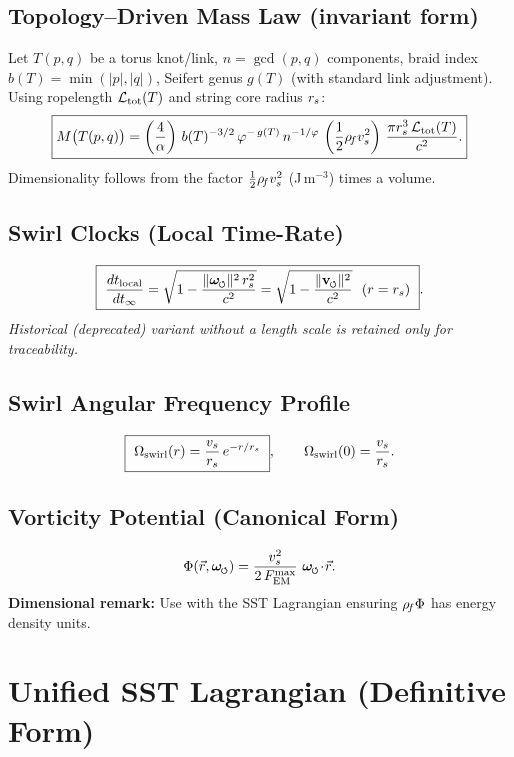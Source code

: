\documentclass[11pt]{article}
\begin{document}
    \subsection{Topology–Driven Mass Law (invariant form)}
    Let \(T(p,q)\) be a torus knot/link, \(n=\gcd(p,q)\) components, braid index \(b(T)=\min(|p|,|q|)\), Seifert genus \(g(T)\) (with standard link adjustment). Using ropelength \(\mathcal{L}_{\rm tot}(T)\) and string core radius \(r_s\):
    \[
        \boxed{
            M\big(T(p,q)\big)
            =\left(\frac{4}{\alpha}\right)\,
            b(T)^{-3/2}\,
            \varphi^{-\,g(T)}\,
            n^{-1/\varphi}\,
            \left(\frac{1}{2}\rho_{\!f} v_s^2\right)\,
            \frac{\pi r_s^3\,\mathcal{L}_{\mathrm{tot}}(T)}{c^2}.
        }
    \]
    Dimensionality follows from the factor \(\tfrac12\rho_{\!f} v_s^2\) (J\,m\(^{-3}\)) times a volume.

    \subsection{Swirl Clocks (Local Time-Rate)}
    \[
        \boxed{\ \frac{dt_{\text{local}}}{dt_{\infty}}
            = \sqrt{1 - \frac{\lVert\omegas\rVert^{2}\,\rs^{2}}{c^{2}}}
            = \sqrt{1 - \frac{\lVert\vswirl\rVert^{2}}{c^{2}}}\ \ (r=\rs)\ }.
    \]
    \emph{Historical (deprecated) variant without a length scale is retained only for traceability.}

    \subsection{Swirl Angular Frequency Profile}
    \[
        \boxed{\ \Omega_{\text{swirl}}(r) = \frac{v_s}{r_s}\, e^{-r/r_s}\ },
        \qquad
        \Omega_{\text{swirl}}(0)=\frac{v_s}{r_s}.
    \]

    \subsection{Vorticity Potential (Canonical Form)}
    \[
        \Phi(\vec r,\omegas) = \frac{\vscore^{2}}{2\,F_{\text{EM}}^{\max}}\ \omegas\!\cdot\!\vec r.
    \]
    \textbf{Dimensional remark:} Use with the SST Lagrangian ensuring \(\rho_{\!f}\Phi\) has energy density units.

    \section{Unified SST Lagrangian (Definitive Form)}
    \label{sec:lagrangian}
\end{document}
